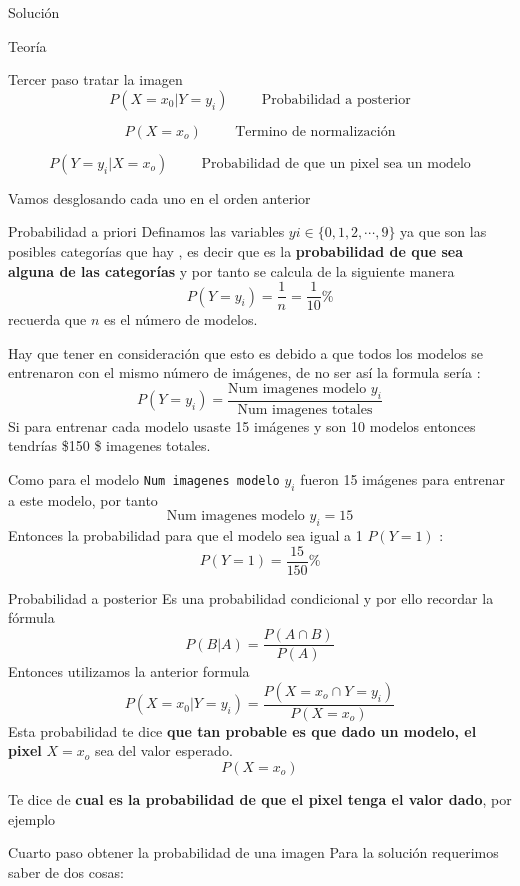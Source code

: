 \documentclass[
  spanish,
  ignorenonframetext,
]{beamer}
\begin{document}
\begin{frame}[fragile]{Solución}
\begin{block}{Teoría}
\begin{block}{Tercer paso tratar la imagen}
\[
P(X=x_0| Y=y_i) \hspace{1cm} \text{Probabilidad a posterior}
\]

\[
P(X=x_o) \hspace{1cm} \text{Termino de normalización}
\]

\[
P(Y=y_i|X=x_o)  \hspace{1cm} \text{Probabilidad  de que un pixel sea un modelo}
\]

Vamos desglosando cada uno en el orden anterior

\begin{block}{Probabilidad a priori}
\protect\hypertarget{probabilidad-a-priori}{}
Definamos las variables \(yi \in \{0,1,2,\cdots,9\}\) ya que son las
posibles categorías que hay , es decir que es la \textbf{probabilidad de
que sea alguna de las categorías} y por tanto se calcula de la siguiente
manera \[
P(Y=y_i)=\frac{1}{n}=\frac{1}{10}\%
\] recuerda que \(n\) es el número de modelos.

Hay que tener en consideración que esto es debido a que todos los
modelos se entrenaron con el mismo número de imágenes, de no ser así la
formula sería : \[
P(Y=y_i)=\frac{\text{Num imagenes modelo }y_i}{\text{Num imagenes totales}}
\] Si para entrenar cada modelo usaste 15 imágenes y son 10 modelos
entonces tendrías \$150 \$ imagenes totales.

Como para el modelo \texttt{Num\ imagenes\ modelo} \(y_i\) fueron 15
imágenes para entrenar a este modelo, por tanto \[
\text{Num imagenes modelo }y_i=15
\] Entonces la probabilidad para que el modelo sea igual a 1 \(P(Y=1)\)
: \[
P(Y=1)=\frac{15}{150}\%
\]
\end{block}

\begin{block}{Probabilidad a posterior}
\protect\hypertarget{probabilidad-a-posterior}{}
Es una probabilidad condicional y por ello recordar la fórmula \[
P(B|A)=\frac{P(A\cap B)}{P(A)}
\] Entonces utilizamos la anterior formula \[
P(X=x_0| Y=y_i)=\frac{P(X=x_o\cap Y=y_i)}{P(X=x_o)}
\] Esta probabilidad te dice \textbf{que tan probable es que dado un
modelo, el pixel } \(X=x_o\) sea del valor esperado. \[
P(X=x_o)
\]

Te dice de \textbf{cual es la probabilidad de que el pixel tenga el
valor dado}, por ejemplo
\end{block}
\end{block}

\begin{block}{Cuarto paso obtener la probabilidad de una imagen}
\protect\hypertarget{cuarto-paso-obtener-la-probabilidad-de-una-imagen}{}
Para la solución requerimos saber de dos cosas:


\end{block}
\end{block}
\end{frame}
\end{document}
